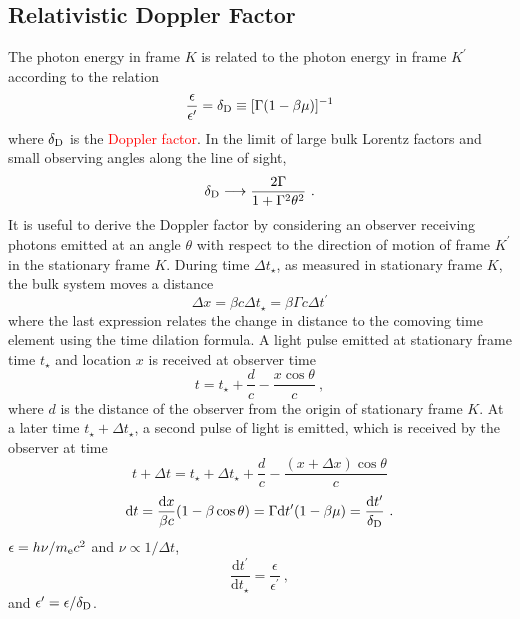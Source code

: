 \documentclass[12pt,a4paper]{article}
\newcommand{\dif}{\mathrm{d}}
\begin{document}
\subsection{Relativistic Doppler Factor}
The photon energy in frame $K$ is related to the photon energy in frame $K^{\prime}$ according to the relation
\begin{equation}
\frac{\epsilon}{\epsilon^{\prime}} = \delta_{\rm D} \equiv [\Gamma(1-\beta \mu)]^{-1}
\end{equation}
where \textcolor{red}{$\delta_{\rm D}$} is the \textcolor{red}{Doppler factor}. In the limit of large bulk Lorentz factors and small observing angles along the line of sight,
\begin{equation}
\delta_{\rm D} \longrightarrow \frac{2\Gamma}{1+\Gamma^2 \theta^2} ~.
\end{equation}
It is useful to derive the Doppler factor by considering an observer receiving photons emitted at an angle $\theta$ with respect to the direction of motion of frame $K^{\prime}$ in the stationary frame $K$. During time $\Delta t_\star$, as measured in stationary frame $K$, the bulk system moves a distance
\begin{equation*}
\Delta x =\beta c \Delta t_\star = \beta \Gamma c \Delta t^{\prime}
\end{equation*}
where the last expression relates the change in distance to the comoving time element using the time dilation formula. A light pulse emitted at stationary frame time $t_\star$ and location $x$ is received at observer time
\begin{equation}
t = t_\star +\frac{d}{c} -\frac{x\cos \theta}{c} ~,
\end{equation}
where $d$ is the distance of the observer from the origin of stationary frame $K$. At a later time $t_\star + \Delta t_\star$, a second pulse of light is emitted, which is received by the observer at time
\begin{equation}
t + \Delta t = t_\star +\Delta t_\star + \frac{d}{c} - \frac{(x+\Delta x)\cos \theta}{c}
\end{equation}
\begin{equation}
\dif t = \frac{\dif x}{\beta c} (1-\beta \cos \theta) = \Gamma \dif t^{\prime} (1-\beta \mu) = \frac{\dif t^{\prime}}{\delta_{\rm D}} ~.
\end{equation}
$\epsilon = h\nu/m_{\rm e}c^2$ and $\nu \propto 1/\Delta t$, 
\begin{equation}
\frac{\dif t^{\prime}}{\dif t_\star} = \frac{\epsilon}{\epsilon^{\prime}} ~,
\end{equation}
and $\epsilon^{\prime} = \epsilon/\delta_{\rm D}$. 
\end{document}
